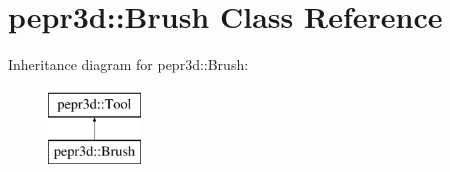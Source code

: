 \hypertarget{classpepr3d_1_1_brush}{}\section{pepr3d\+::Brush Class Reference}
\label{classpepr3d_1_1_brush}
Inheritance diagram for pepr3d\+::Brush\+:\begin{figure}[H]
\begin{center}
\leavevmode
\includegraphics[height=2.000000cm]{classpepr3d_1_1_brush}
\end{center}
\end{figure}

